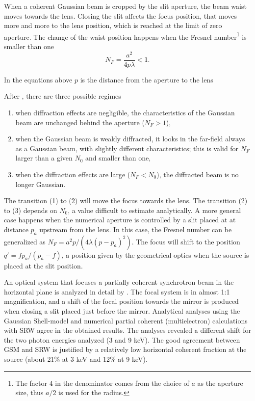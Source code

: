 \documentclass{iucr}              %
\begin{document}
When a coherent Gaussian beam is cropped by the slit aperture, the beam waist moves towards the lens. Closing the slit affects the focus position, that moves more and more to the lens position, which is reached at the limit of zero aperture. The change of the waist position happens when the Fresnel number\footnote{
The factor 4 in the denominator comes from the choice of $a$ as the aperture size, thus $a/2$ is used for the radius.} is smaller than one
\begin{equation}
    N_F = \frac{a^2}{4 p \lambda}  < 1.
\end{equation}

In the equations above $p$ is the distance from the aperture to the lens

After , there are three possible regimes 
\begin{enumerate}
\item when diffraction effects are negligible, the
characteristics of the Gaussian beam are unchanged
behind the aperture ($N_F>1$),
\item when the Gaussian
beam is weakly diffracted, it looks in the far-field always as a Gaussian beam, with slightly different characteristics; this is valid for $N_F$ larger than a given $N_0$ and smaller than one,
\item when the diffraction effects are large ($N_F<N_0$),
the diffracted beam is no longer Gaussian.
\end{enumerate}

The transition (1) to (2) will move the focus towards the lens. The transition (2) to (3) depends on $N_0$, a value difficult to estimate analytically. A more general case happens when the numerical aperture is controlled by a slit placed at at distance $p_a$ upstream from the lens. 
In this case, the Fresnel number can be generalized as $N_F=a^2 p / (4 \lambda (p-p_a)^2)$. The focus will shift to the position $q'=f p_a/(p_a-f)$, a position given by the geometrical optics when the source is placed at the slit position. 

An optical system that focuses a partially coherent synchrotron beam in the horizontal plane is analyzed in detail by . The focal system is in almost 1:1 magnification, and a shift of the focal position towards the mirror is produced when closing a slit placed just before the mirror. Analytical analyses using the Gaussian Shell-model and numerical partial coherent (multielectron) calculations with SRW \cite{codeSRW} agree in the obtained results. The analyses revealed a different shift for the two photon energies analyzed (3 and 9 keV). The good agreement between GSM and SRW is justified by a relatively low horizontal coherent fraction at the source (about 21\% at 3 keV and 12\% at 9 keV).
 
\end{document}
